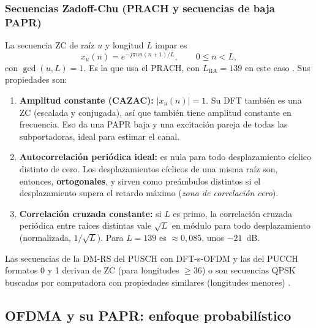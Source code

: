 \subsubsection{Secuencias Zadoff-Chu (PRACH y secuencias de baja PAPR)}
La secuencia ZC de raíz $u$ y longitud $L$ impar es
\begin{equation}
x_u(n) = e^{-j\pi u n(n+1)/L},\qquad 0\le n < L,
\label{eq:zc}
\end{equation}
con $\gcd(u,L)=1$. Es la que usa el PRACH, con $L_\text{RA}=139$ en este caso \cite[§6.3.3.1]{ts38211}. Sus propiedades son:
\begin{enumerate}
  \item \textbf{Amplitud constante (CAZAC):} $|x_u(n)|=1$. Su DFT también es una ZC (escalada y conjugada), así que también tiene amplitud constante en frecuencia. Eso da una PAPR baja y una excitación pareja de todas las subportadoras, ideal para estimar el canal.
  \item \textbf{Autocorrelación periódica ideal:} es nula para todo desplazamiento cíclico distinto de cero. Los desplazamientos cíclicos de una misma raíz son, entonces, \textbf{ortogonales}, y sirven como preámbulos distintos si el desplazamiento supera el retardo máximo (\emph{zona de correlación cero}).
  \item \textbf{Correlación cruzada constante:} si $L$ es primo, la correlación cruzada periódica entre raíces distintas vale $\sqrt{L}$ en módulo para todo desplazamiento (normalizada, $1/\sqrt{L}$). Para $L=139$ es $\approx 0{,}085$, unos $-21$~dB.
\end{enumerate}
Las secuencias de la DM-RS del PUSCH con DFT-s-OFDM y las del PUCCH formatos 0 y 1 derivan de ZC (para longitudes $\ge 36$) o son secuencias QPSK buscadas por computadora con propiedades similares (longitudes menores) \cite[§5.2.2]{ts38211}.

\subsection{OFDMA y su PAPR: enfoque probabilístico}\label{sec:papr}
